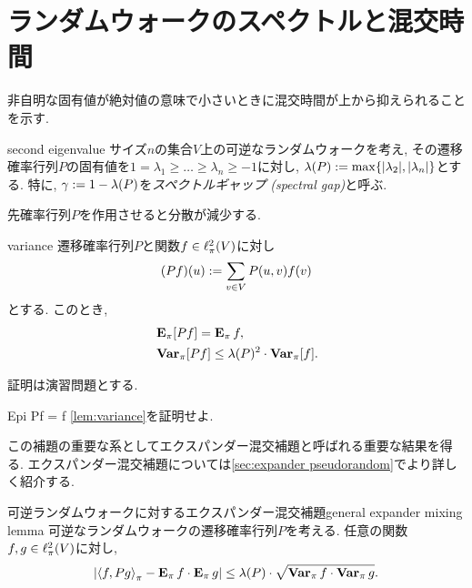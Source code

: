 \section{ランダムウォークのスペクトルと混交時間}
非自明な固有値が絶対値の意味で小さいときに混交時間が上から抑えられることを示す.
\begin{definition}{}{second eigenvalue}
    サイズ$n$の集合$V$上の可逆なランダムウォークを考え,
    その遷移確率行列$P$の固有値を$1=\lambda_1 \ge \dots \ge \lambda_n\ge -1$に対し,
    $\lambda(P) \defeq \max\cbra{\abs{\lambda_2},\abs{\lambda_n}}$とする.
    特に, $\gamma\defeq 1-\lambda(P)$を\emph{スペクトルギャップ (spectral gap)}と呼ぶ.
\end{definition}
先確率行列$P$を作用させると分散が減少する.
\begin{lemma}{}{variance}
    遷移確率行列$P$と関数$f \in \pispace$に対し
    \[
        (Pf)(u) \defeq \sum_{v\in V} P(u,v)f(v)
    \]
    とする. このとき,
    \begin{align*}
        &\Epi[Pf] = \Epi f, \\
        &\Varpi[Pf] \le \lambda(P)^2 \cdot \Varpi [f].        
    \end{align*}
\end{lemma}
証明は演習問題とする.
\begin{exercise}{}{Epi Pf = f}
    \cref{lem:variance}を証明せよ.
\end{exercise}
この補題の重要な系としてエクスパンダー混交補題と呼ばれる重要な結果を得る.
エクスパンダー混交補題については\cref{sec:expander pseudorandom}でより詳しく紹介する.
\begin{corollary}{可逆ランダムウォークに対するエクスパンダー混交補題}{general expander mixing lemma}
    可逆なランダムウォークの遷移確率行列$P$を考える.
    任意の関数$f,g\in\pispace$に対し,
    \[ \abs*{\piprod{f,Pg} - \Epi f \cdot \Epi g} \le \lambda(P)\cdot \sqrt{\Varpi f \cdot \Varpi g}.  \]
\end{corollary}
\begin{comment}
\begin{proof}
    \cref{thm:eigendecomposition}で得られる空間$\pispace$の正規直交基底$x_1,\dots,x_n$を考え,
    関数$f$をそれらの線形結合
    \[ f = \sum_{i=1}^n f_i x_i\]
    で表す (ここで$f_i = \piprod{f,x_i}$).
    ここで, $x_1 = \allone$なので$f_1 = \E_\pi f$なので,
    両辺に左から$P$を掛けて移項すると
    \[
        Pf - \Epi[f] \allone  = \sum_{i=2}^n f_i P x_i = \sum_{i=2}^n \lambda_i f_i x_i
    \]
    を得る.
    両辺の$\pinorm{\cdot}$をとると, ピタゴラスの定理より
    \begin{align*}
        \pinorm{Pf - \Epi[f]\allone}^2 &= \sum_{i=2}^n f_i^2 \lambda_i^2 \\
        &\le \lambda(P)^2\cdot \sum_{i=2}^n f_i^2 \\
        &= \lambda(P)^2\cdot \pinorm{f - \Epi[f]\allone}^2 \\
        &= \lambda(P)^2\cdot \Varpi f
    \end{align*}
    を得る.
\end{proof}
\end{comment}
